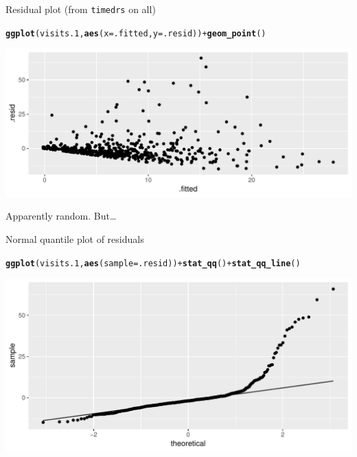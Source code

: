 \documentclass[unknownkeysallowed]{beamer}\usepackage[]{graphicx}\usepackage[]{color}
\makeatletter
\def\maxwidth{ %
  \ifdim\Gin@nat@width>\linewidth
    \linewidth
  \else
    \Gin@nat@width
  \fi
}
\newcommand{\hlopt}[1]{\textcolor[rgb]{0,0,0}{#1}}%
\newcommand{\hlstd}[1]{\textcolor[rgb]{0.345,0.345,0.345}{#1}}%
\newcommand{\hlkwc}[1]{\textcolor[rgb]{0.333,0.667,0.333}{#1}}%
\newcommand{\hlkwd}[1]{\textcolor[rgb]{0.737,0.353,0.396}{\textbf{#1}}}%
\newenvironment{kframe}{%
 \def\at@end@of@kframe{}%
 \ifinner\ifhmode%
  \def\at@end@of@kframe{\end{minipage}}%
  \begin{minipage}{\columnwidth}%
 \fi\fi%
 \def\FrameCommand##1{\hskip\@totalleftmargin \hskip-\fboxsep
 \colorbox{shadecolor}{##1}\hskip-\fboxsep
     \hskip-\linewidth \hskip-\@totalleftmargin \hskip\columnwidth}%
 \MakeFramed {\advance\hsize-\width
   \@totalleftmargin\z@ \linewidth\hsize
   \@setminipage}}%
 {\par\unskip\endMakeFramed%
 \at@end@of@kframe}
\newenvironment{knitrout}{}{} %
\makeatother
\begin{document}
\begin{frame}[fragile]{Residual plot (from \texttt{timedrs} on all)}
 
\begin{knitrout}\small
{}\color{fgcolor}\begin{kframe}
\begin{alltt}
\hlkwd{ggplot}\hlstd{(visits.1,}\hlkwd{aes}\hlstd{(}\hlkwc{x}\hlstd{=.fitted,}\hlkwc{y}\hlstd{=.resid))}\hlopt{+}\hlkwd{geom_point}\hlstd{()}
\end{alltt}
\end{kframe}
\includegraphics[width=\maxwidth]{figure/iffy8-1} 

\end{knitrout}

Apparently random. But\ldots


\end{frame}

\begin{frame}[fragile]{Normal quantile plot of residuals}
  
\begin{knitrout}
\color{fgcolor}\begin{kframe}
\begin{alltt}
\hlkwd{ggplot}\hlstd{(visits.1,} \hlkwd{aes}\hlstd{(}\hlkwc{sample}\hlstd{=.resid))}\hlopt{+}\hlkwd{stat_qq}\hlstd{()}\hlopt{+}\hlkwd{stat_qq_line}\hlstd{()}
\end{alltt}
\end{kframe}
\includegraphics[width=\maxwidth]{figure/unnamed-chunk-30-1} 

\end{knitrout}
  
\end{frame}
\end{document}
